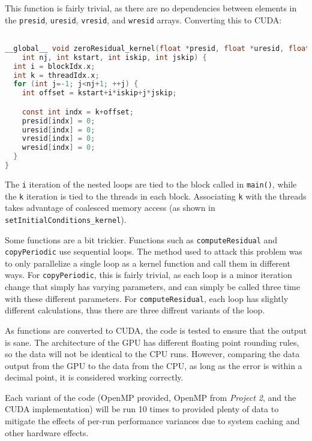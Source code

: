 \documentclass{article}
\begin{document}
  This function is fairly trivial, as there are no dependencies between
  elements in the \verb|presid|, \verb|uresid|, \verb|vresid|, and 
  \verb|wresid| arrays. Converting this to CUDA:

  \begin{lstfloat}
    \begin{lstlisting}[language=C,
                      linewidth=1\textwidth,
                      breaklines=true,
                      basicstyle=\small\ttfamily]

__global__ void zeroResidual_kernel(float *presid, float *uresid, float *vresid, float *wresid,
    int nj, int kstart, int iskip, int jskip) {
  int i = blockIdx.x;
  int k = threadIdx.x;
  for (int j=-1; j<nj+1; ++j) {
    int offset = kstart+i*iskip+j*jskip;

    const int indx = k+offset;
    presid[indx] = 0;
    uresid[indx] = 0;
    vresid[indx] = 0;
    wresid[indx] = 0;
  }
}

    \end{lstlisting}
  \end{lstfloat}

  The \verb|i| iteration of the nested loops are tied to the block called in
  \verb|main()|, while the \verb|k| iteration is tied to the threads in each
  block. Associating \verb|k| with the threads takes advantage of coalesced
  memory access (as shown in \verb|setInitialConditions_kernel|).

  Some functions are a bit trickier. Functions such as \verb|computeResidual|
  and \verb|copyPeriodic| use sequential loops. The method used to attack
  this problem was to only parallelize a single loop as a kernel function and
  call them in different ways. For \verb|copyPeriodic|, this is fairly trivial,
  as each loop is a minor iteration change that simply has varying parameters,
  and can simply be called three time with these different parameters. For
  \verb|computeResidual|, each loop has slightly different calculations, thus
  there are three diffrent variants of the loop.

  As functions are converted to CUDA, the code is tested to ensure that the
  output is sane. The architecture of the GPU has different floating point
  rounding rules, so the data will not be identical to the CPU runs. However,
  comparing the data output from the GPU to the data from the CPU, as long as
  the error is within a decimal point, it is considered working correctly.

  Each variant of the code (OpenMP provided, OpenMP from \textit{Project 2},
  and the CUDA implementation) will be run 10 times to provided plenty of
  data to mitigate the effects of per-run performance variances due to
  system caching and other hardware effects.
\end{document}
